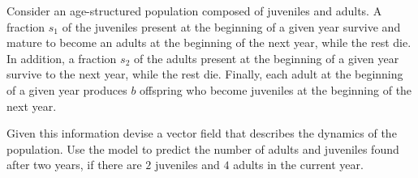 \documentclass[../book.tex]{subfiles}
\begin{document}
\begin{example} \label{eg:age}
Consider an age-structured population composed of juveniles and adults. A fraction \(s_1\) of the juveniles present at the beginning of a given year survive and mature to become an adults at the beginning of the next year, while the rest die. In addition, a fraction \(s_2\) of the adults present at the beginning of a given year survive to the next year, while the rest die. Finally, each adult at the beginning of a given year produces \(b\) offspring who become juveniles at the beginning of the next year.

Given this information devise a vector field that describes the dynamics of the population. Use the model to predict the number of adults and juveniles found after two years, if there are \(2\) juveniles and \(4\) adults in the current year.
\end{example}
\end{document}

